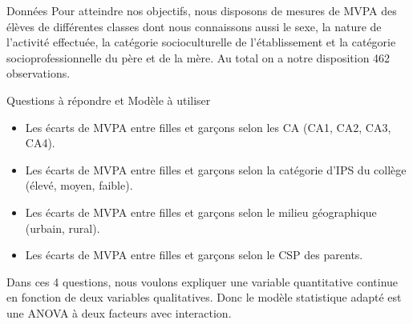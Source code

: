 \documentclass{beamer}
\begin{document}
	\begin{frame}{Données}
		Pour atteindre nos objectifs, nous disposons de mesures de MVPA des élèves de différentes classes dont nous connaissons aussi le sexe, la nature de l'activité effectuée, la catégorie socioculturelle de l'établissement et la catégorie socioprofessionnelle du père et de la mère. Au total on a notre disposition 462 observations.\\
	\end{frame}
	\begin{frame}{Questions à répondre et Modèle à utiliser}
		\begin{itemize}
			\item Les écarts de MVPA entre filles et garçons selon les CA (CA1, CA2, CA3, CA4).
			\item Les écarts de MVPA entre filles et garçons selon la catégorie d’IPS du collège (élevé, moyen, faible).
			\item Les écarts de MVPA entre filles et garçons selon le milieu géographique (urbain, rural).
			\item Les écarts de MVPA entre filles et garçons selon le CSP des parents.
		\end{itemize}
		Dans ces 4 questions, nous voulons expliquer une variable quantitative continue en fonction de deux variables qualitatives. Donc le modèle statistique adapté est une ANOVA à deux facteurs avec interaction.
	\end{frame}
	
\end{document}
